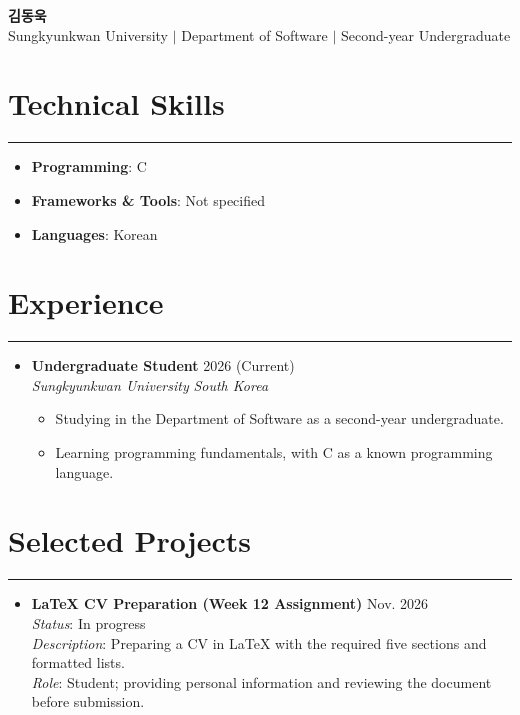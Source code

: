 \documentclass[letterpaper,10pt]{article}
\begin{document}
\begin{center}
    {\LARGE\bfseries 김동욱}\\[3pt]
    {\small Sungkyunkwan University $\vert$ Department of Software $\vert$ Second-year Undergraduate}
\end{center}
\vspace{7pt}

\section*{Technical Skills}
\hrule
\vspace{4pt}
\begin{itemize}[label={}]
    \item \textbf{Programming}: C
    \item \textbf{Frameworks \& Tools}: Not specified
    \item \textbf{Languages}: Korean
\end{itemize}

\section*{Experience}
\hrule
\vspace{4pt}
\begin{itemize}[label={}]
    \item \textbf{Undergraduate Student} \hfill 2026 (Current)\\
    \textit{Sungkyunkwan University} \hfill \textit{South Korea}
    \begin{itemize}
        \item Studying in the Department of Software as a second-year undergraduate.
        \item Learning programming fundamentals, with C as a known programming language.
    \end{itemize}
\end{itemize}

\section*{Selected Projects}
\hrule
\vspace{4pt}
\begin{itemize}
    \item \textbf{LaTeX CV Preparation (Week 12 Assignment)} \hfill Nov. 2026\\
    \textit{Status}: In progress\\
    \textit{Description}: Preparing a CV in LaTeX with the required five sections and formatted lists.\\
    \textit{Role}: Student; providing personal information and reviewing the document before submission.
\end{itemize}
\end{document}
